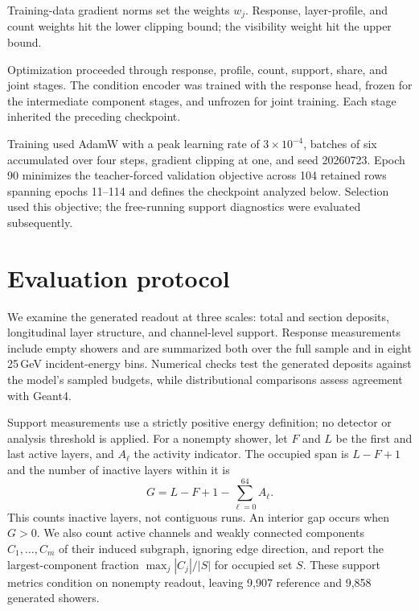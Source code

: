 \documentclass[11pt]{article}
\begin{document}
Training-data gradient norms set the weights $w_j$. Response, layer-profile, and count weights hit the lower clipping bound; the visibility weight hit the upper bound.

Optimization proceeded through response, profile, count, support, share, and joint stages. The condition encoder was trained with the response head, frozen for the intermediate component stages, and unfrozen for joint training. Each stage inherited the preceding checkpoint.

Training used AdamW with a peak learning rate of $3\times10^{-4}$, batches of six accumulated over four steps, gradient clipping at one, and seed 20260723. Epoch 90 minimizes the teacher-forced validation objective across 104 retained rows spanning epochs 11--114 and defines the checkpoint analyzed below. Selection used this objective; the free-running support diagnostics were evaluated subsequently.

\section{Evaluation protocol}
\label{sec:diagnostics}

We examine the generated readout at three scales: total and section deposits, longitudinal layer structure, and channel-level support. Response measurements include empty showers and are summarized both over the full sample and in eight 25\,GeV incident-energy bins. Numerical checks test the generated deposits against the model's sampled budgets, while distributional comparisons assess agreement with Geant4.

Support measurements use a strictly positive energy definition; no detector or analysis threshold is applied. For a nonempty shower, let $F$ and $L$ be the first and last active layers, and $A_\ell$ the activity indicator. The occupied span is $L-F+1$ and the number of inactive layers within it is
\begin{equation}
 G=L-F+1-\sum_{\ell=0}^{64}A_\ell.
 \label{eq:gaps}
\end{equation}
This counts inactive layers, not contiguous runs. An interior gap occurs when $G>0$. We also count active channels and weakly connected components $C_1,\ldots,C_m$ of their induced subgraph, ignoring edge direction, and report the largest-component fraction $\max_j|C_j|/|S|$ for occupied set $S$. These support metrics condition on nonempty readout, leaving 9,907 reference and 9,858 generated showers.
\end{document}
